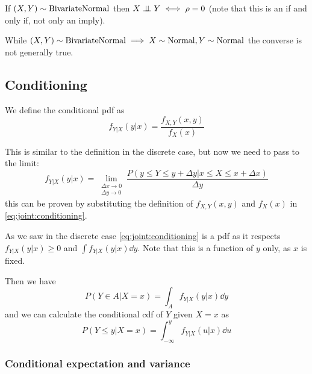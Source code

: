 \documentclass[12pt]{extarticle}
\newcommand{\Normal}{{\operatorfont Normal}}
\newcommand{\BivariateNormal}{{\operatorfont BivariateNormal}}
\begin{document}
\begin{remark}
    If $(X, Y) \sim \BivariateNormal$ then $X \perp \!\!\! \perp Y \iff \rho = 0$ (note that this is an if and only if, not only an imply).
\end{remark}

\begin{remark}
    While $(X, Y) \sim \BivariateNormal \implies X \sim \Normal, Y \sim \Normal$ the converse is not generally true.
\end{remark}

\subsection{Conditioning}

\begin{definition}
    We define the conditional pdf as
    \begin{equation}
        f_{Y | X}(y | x) = \frac{f_{X, Y}(x, y)}{f_X(x)} \label{eq:joint:conditioning}
    \end{equation}
\end{definition}

This is similar to the definition in the discrete case, but now we need to pass to the limit:
\begin{equation}
    f_{Y|X}(y|x) = \lim_{\substack{\Delta x \to 0 \\ \Delta y \to 0}} \frac{P\left(y \leq Y \leq y + \Delta y \big| x \leq X \leq x + \Delta x\right)}{\Delta y}
\end{equation}
this can be proven by substituting the definition of $f_{X, Y}(x,y)$ and $f_X(x)$ in \autoref{eq:joint:conditioning}.


As we saw in the discrete case \autoref{eq:joint:conditioning} is a pdf as it respects $f_{Y|X}(y | x) \geq 0$ and $\int f_{Y|X}(y|x) \dd{y}$.
Note that this is a function of $y$ only, as $x$ is fixed.

Then we have
\begin{equation}
    P(Y \in A | X = x) = \int_A f_{Y|X}(y|x) \dd{y}
\end{equation}
and we can calculate the conditional cdf of $Y$ given $X = x$ as
\begin{equation}
    P(Y \leq y | X = x) = \int_{-\infty}^y f_{Y|X}(u|x) \dd{u}
\end{equation}

\subsubsection{Conditional expectation and variance}
\end{document}
